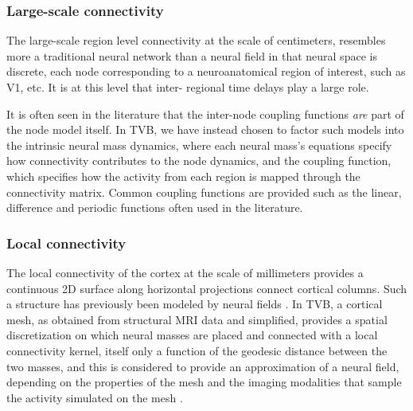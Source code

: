     \subsubsection{Large-scale connectivity}

    The large-scale region level connectivity at the scale of centimeters,
    resembles more a traditional neural network than a neural field in that
    neural space is discrete,  each node corresponding to a neuroanatomical
    region of interest, such as V1, etc. It is at this level that inter-
    regional time delays play a large role.

    It is often seen in the literature that the inter-node coupling functions
    \textit{are} part of the node model itself. In TVB, we have instead 
    chosen to factor such models into the intrinsic neural mass dynamics, where each 
    neural mass's equations specify how connectivity contributes to the
    node dynamics, and the coupling function, which specifies how the activity
    from each region is mapped through the connectivity matrix. Common coupling 
    functions are provided such as the linear, difference and periodic functions
    often used in the literature.

    \subsubsection{Local connectivity}

    The local connectivity of the cortex at the scale of millimeters provides
    a continuous 2D surface along horizontal projections connect 
    cortical columns. Such a structure has previously been modeled by
    neural fields \cite{Amari_1977, Jirsa_1997, Liley_1999}. In TVB, a cortical mesh, 
    as obtained from structural MRI data and simplified, provides a spatial 
    discretization on which neural masses are placed and connected with a
    local connectivity kernel, itself only a function of the geodesic distance
    between the two masses, and this is considered to provide an
    approximation of a neural field, depending on the properties
    of the mesh and the imaging modalities that sample the activity simulated
    on the mesh \cite{Spiegler_2013}. 

